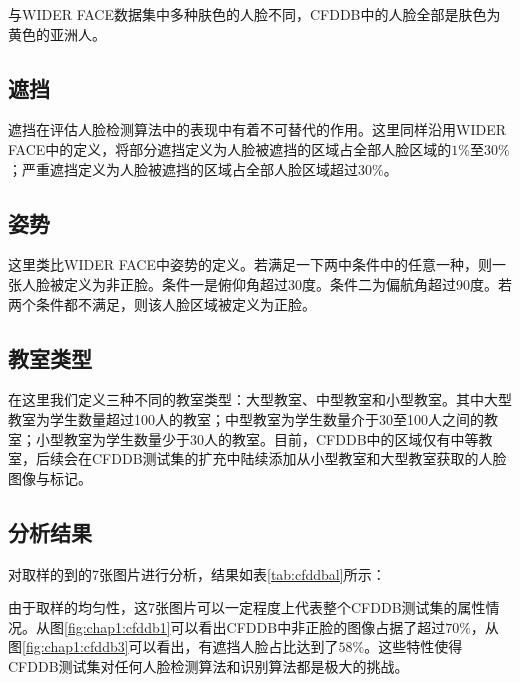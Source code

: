 与WIDER FACE数据集中多种肤色的人脸不同，CFDDB中的人脸全部是肤色为黄色的亚洲人。

\subsection{遮挡}

遮挡在评估人脸检测算法中的表现中有着不可替代的作用。这里同样沿用WIDER FACE中的定义，将部分遮挡定义为人脸被遮挡的区域占全部人脸区域的$1\%$至$30\%$；严重遮挡定义为人脸被遮挡的区域占全部人脸区域超过$30\%$。

\subsection{姿势}

这里类比WIDER FACE中姿势的定义。若满足一下两中条件中的任意一种，则一张人脸被定义为非正脸。条件一是俯仰角超过30度。条件二为偏航角超过90度。若两个条件都不满足，则该人脸区域被定义为正脸。

\subsection{教室类型}

在这里我们定义三种不同的教室类型：大型教室、中型教室和小型教室。其中大型教室为学生数量超过100人的教室；中型教室为学生数量介于30至100人之间的教室；小型教室为学生数量少于30人的教室。目前，CFDDB中的区域仅有中等教室，后续会在CFDDB测试集的扩充中陆续添加从小型教室和大型教室获取的人脸图像与标记。

\subsection{分析结果}

对取样的到的7张图片进行分析，结果如表\ref{tab:cfddbal}所示：

由于取样的均匀性，这7张图片可以一定程度上代表整个CFDDB测试集的属性情况。从图\ref{fig:chap1:cfddb1}可以看出CFDDB中非正脸的图像占据了超过$70\%$，从图\ref{fig:chap1:cfddb3}可以看出，有遮挡人脸占比达到了$58\%$。这些特性使得CFDDB测试集对任何人脸检测算法和识别算法都是极大的挑战。

